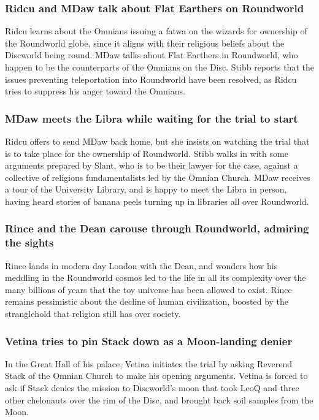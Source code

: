 \subsubsection{\Gls{Ridcu} and \Gls{MDaw} talk about Flat Earthers on Roundworld}
\Gls{Ridcu} learns about the Omnians issuing a fatwa on the wizards for ownership of the Roundworld
globe, since it aligns with their religious beliefs about the Discworld being round. \Gls{MDaw}
talks about Flat Earthers in Roundworld, who happen to be the counterparts of the Omnians on the
Disc. \Gls{Stibb} reports that the issues preventing teleportation into Roundworld have been
resolved, as \Gls{Ridcu} tries to suppress his anger toward the Omnians.

\subsubsection{\Gls{MDaw} meets the \Gls{Libra} while waiting for the trial to start}
\Gls{Ridcu} offers to send \Gls{MDaw} back home, but she insists on watching the trial that is to
take place for the ownership of Roundworld. \Gls{Stibb} walks in with some arguments prepared by
\Gls{Slant}, who is to be their lawyer for the case, against a collective of religious
fundamentalists led by the Omnian Church. \Gls{MDaw} receives a tour of the University Library,
and is happy to meet the \Gls{Libra} in person, having heard stories of banana peels turning up in
libraries all over Roundworld.

\subsubsection{\Gls{Rince} and the \Gls{Dean} carouse through Roundworld, admiring the sights}
\Gls{Rince} lands in modern day London with the \Gls{Dean}, and wonders how his meddling in the
Roundworld cosmos led to the life in all its complexity over the many billions of years that the
toy universe has been allowed to exist. \Gls{Rince} remains pessimistic about the decline of human
civilization, boosted by the stranglehold that religion still has over society.

\subsubsection{\Gls{Vetina} tries to pin \Gls{Stack} down as a Moon-landing denier}
In the Great Hall of his palace, \Gls{Vetina} initiates the trial by asking Reverend \Gls{Stack} of
the Omnian Church to make his opening arguments. \Gls{Vetina} is forced to ask if \Gls{Stack} denies
the mission to Discworld's moon that took \Gls{LeoQ} and three other chelonauts over the rim of the
Disc, and brought back soil samples from the Moon.

